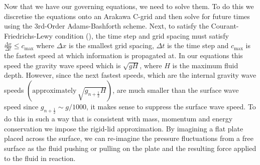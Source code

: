 \documentclass[10pt,a4paper]{report}
\newcommand*{\half}{\frac{1}{2}}
\begin{document}
Now that we have our governing equations, we need to solve them. To do this we
discretise the equations onto an Arakawa C-grid and then solve for future times
using the 3rd-Order Adams-Bashforth scheme. Next, to satisfy the Courant-Friedrichs-Lewy
 condition (\cite{courant1928partiellen}), the time step and grid spacing must satisfy $\frac{\Delta x}{\Delta t} \leq c_{\max}$ where $\Delta x$ is the smallest grid spacing, $\Delta t$ is
 the time step and $c_{\max}$ is the fastest speed at which information is propagated at. 
 In our equations this speed the gravity wave speed which is $\sqrt{g H}$, where $H$ is the
 maximum fluid depth. However, since the next fastest speeds, which are the internal gravity
  wave speeds $\left(\mathrm{approximately} \, \sqrt{g_{n+\half} H}\right)$, are much smaller than the surface
  wave speed since $g_{n+\half} \sim g/1000$, it makes sense to suppress the surface 
  wave speed. To do this in such a way that is consistent with mass, momentum and energy 
  conservation we impose the rigid-lid approximation. By imagining a flat plate 
  placed across the surface, we can re-imagine the pressure fluctuations from a free
  surface as the fluid pushing or pulling on the plate and the resulting force 
  applied to the fluid in reaction. 
  
\end{document}
